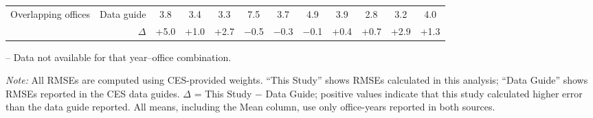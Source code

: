 \begin{table}[p]
{\begin{threeparttable}
\begin{tabular}{lrcccccccccc}
Overlapping offices & Data guide & 3.8 & 3.4 & 3.3 & 7.5 & 3.7 & 4.9 & 3.9 & 2.8 & 3.2 & 4.0 \\
 & $\Delta$ & +5.0 & +1.0 & +2.7 & $-$0.5 & $-$0.3 & $-$0.1 & +0.4 & +0.7 & +2.9 & +1.3 \\
\bottomrule
\end{tabular}
\begin{tablenotes}
\footnotesize
\item -- Data not available for that year--office combination.
\item \textit{Note:} All RMSEs are computed using CES-provided weights. ``This Study'' shows RMSEs calculated in this analysis; ``Data Guide'' shows RMSEs reported in the CES data guides. $\Delta$ = This Study $-$ Data Guide; positive values indicate that this study calculated higher error than the data guide reported. All means, including the Mean column, use only office-years reported in both sources.
\end{tablenotes}
\end{threeparttable}%
}
\end{table}